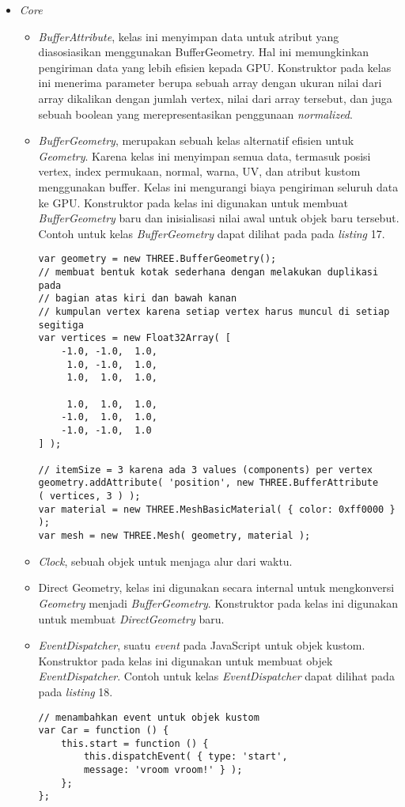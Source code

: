 \documentclass[a4paper,twoside]{article}
\begin{document}
\begin{enumerate}
\begin{itemize}
\item \textit{Core}
	\begin{itemize}
	\item{\it BufferAttribute}, kelas ini menyimpan data untuk atribut yang diasosiasikan menggunakan BufferGeometry. Hal ini memungkinkan pengiriman data yang lebih efisien kepada GPU. Konstruktor pada kelas ini menerima parameter berupa sebuah array dengan ukuran nilai dari array dikalikan dengan jumlah vertex, nilai dari array tersebut, dan juga sebuah boolean yang merepresentasikan penggunaan {\it normalized}.
	\item{\it BufferGeometry}, merupakan sebuah kelas alternatif efisien untuk {\it Geometry}. Karena kelas ini menyimpan semua data, termasuk posisi vertex, index permukaan, normal, warna, UV, dan atribut kustom menggunakan buffer. Kelas ini mengurangi biaya pengiriman seluruh data ke GPU. Konstruktor pada kelas ini digunakan untuk membuat {\it BufferGeometry} baru dan inisialisasi nilai awal untuk objek baru tersebut. Contoh untuk kelas {\it BufferGeometry} dapat dilihat pada pada {\it listing} 17.
\begin{lstlisting}[caption={Contoh instansiasi kelas {\it BufferGeometry} dengan membuat bentuk kotak sederhana.},captionpos=b]
var geometry = new THREE.BufferGeometry();
// membuat bentuk kotak sederhana dengan melakukan duplikasi pada
// bagian atas kiri dan bawah kanan
// kumpulan vertex karena setiap vertex harus muncul di setiap segitiga
var vertices = new Float32Array( [
	-1.0, -1.0,  1.0,
	 1.0, -1.0,  1.0,
	 1.0,  1.0,  1.0,

	 1.0,  1.0,  1.0,
	-1.0,  1.0,  1.0,
	-1.0, -1.0,  1.0
] );

// itemSize = 3 karena ada 3 values (components) per vertex
geometry.addAttribute( 'position', new THREE.BufferAttribute
( vertices, 3 ) );
var material = new THREE.MeshBasicMaterial( { color: 0xff0000 } );
var mesh = new THREE.Mesh( geometry, material );
\end{lstlisting}

	\item{\it Clock}, sebuah objek untuk menjaga alur dari waktu.
	\item{Direct Geometry}, kelas ini digunakan secara internal untuk mengkonversi {\it Geometry} menjadi {\it BufferGeometry}. Konstruktor pada kelas ini digunakan untuk membuat {\it DirectGeometry} baru.
	\item{\it EventDispatcher}, suatu {\it event} pada JavaScript untuk objek kustom. Konstruktor pada kelas ini digunakan untuk membuat objek {\it EventDispatcher}. Contoh untuk kelas {\it EventDispatcher} dapat dilihat pada pada {\it listing} 18.
\begin{lstlisting}[caption={Contoh penggunaan objek {\it EventDispatcher} untuk objek kustom.},captionpos=b]
// menambahkan event untuk objek kustom
var Car = function () {
    this.start = function () {
        this.dispatchEvent( { type: 'start',
        message: 'vroom vroom!' } );
    };
};


\end{lstlisting}
\end{itemize}
\end{itemize}
\end{enumerate}
\end{document}
